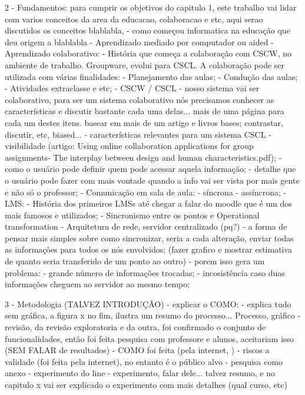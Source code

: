         2 - Fundamentos:
        para cumprir os objetivos do capitulo 1, este trabalho vai lidar com varios conceitos da area da educacao, colaboracao e etc, aqui serao discutidos os conceitos blablabla, 
            - como começou informatica na educação que deu origem a blablabla
            - Aprendizado mediado por computador ou aided
            - Aprendizado colaborativo:
                - História que começa a colaboração com CSCW, no ambiente de trabalho. Groupware, evolui para CSCL. A colaboração pode ser utilizada com várias finalidades:
                    - Planejamento das aulas;
                    - Condução das aulas;
                    - Atividades extraclasse e etc;
                - CSCW / CSCL
                    - nosso sistema vai ser colaborativo, para ser um sistema colaborativo nós precisamos conhecer as características e discutir bastante cada uma delas... mais de uma página para cada um destes itens. basear em mais de um artigo e livros bases; contrastar, discutir, etc, biased...
                    - características relevantes para um sistema CSCL
                        - visibilidade (artigo: Using online collaboration applications for group assignments- The interplay between design and human characteristics.pdf);
                    - como o usuário pode definir quem pode acessar aquela informação;
                    - detalhe que o usuário pode fazer com mais vontade quando a info vai ser vista por mais gente e não só o professor;
                        - Comunicação em sala de aula: 
                            - síncrona 
                            - assíncrona;
            - LMS:
                - História dos primeiros LMSs até chegar a falar do moodle que é um dos mais famosos e utilizados;
            - Sincronismo entre os pontos e Operational transformation
                - Arquitetura de rede, servidor centralizado (pq?)
                - a forma de pensar mais simples sobre como sincronizar, seria a cada alteração, enviar todas as informações para todos os nós envolvidos;
                (fazer grafico e mostrar estimativa de quanto seria transferido de um ponto ao outro)
                    - porem isso gera um problema: 
                        - grande número de informações trocadas;
                        - incosistência caso duas informações cheguem ao servidor ao mesmo tempo;


        3 - Metodologia (TALVEZ INTRODUÇÃO) - explicar o COMO:
            - explica tudo sem gráfica, a figura x no fim, ilustra um resumo do processo... Processo, gráfico
            - revisão, da revisão exploratoria e da outra, foi confirmado o conjunto de funcionalidades, então foi feita pesquisa com professore e alunos, aceitariam isso (SEM FALAR de resultados)
                - COMO foi feita (pela internet, )
                - riscos a validade (foi feita pela internet), no entanto é o público alvo
                - pesquisa como anexo
            - experimento do line
            - experimento, falar dele... talvez resumo, e no capitulo x vai ser explicado o experimento com mais detalhes (qual curso, etc)



